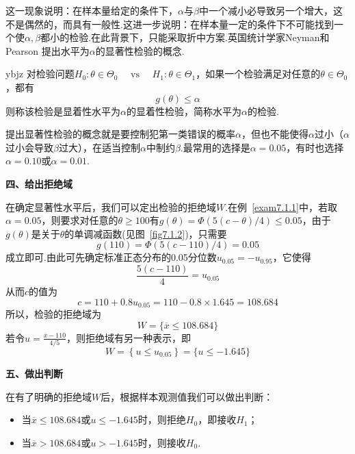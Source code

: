 这一现象说明：在样本量给定的条件下，$\alpha$与$\beta$中一个减小必导致另一个增大，这不是偶然的，而具有一般性.这进一步说明：在样本量一定的条件下不可能找到一个使$\alpha,\beta$都小的检验.在此背景下，只能采取折中方案.英国统计学家Neyman和Pearson 提出水平为$\alpha$的显著性检验的概念.
\begin{definition}{}{ybjz}
	对检验问题$H _ { 0 } : \theta \in \Theta _ { 0 } \quad \text { vs } \quad H _ { 1 } : \theta \in \Theta _ { 1 }$，如果一个检验满足对任意的$\theta \in \Theta _ { 0 }$，都有
	\[g ( \theta ) \leq \alpha\]
	则称该检验是显着性水平为$\alpha$的显着性检验，简称水平为$\alpha$的检验.
\end{definition}
提出显著性检验的概念就是要控制犯第一类错误的概率$\alpha$，但也不能使得$\alpha$过小（$\alpha$过小会导致$\beta$过大），在适当控制$\alpha$中制约$\beta$.最常用的选择是$\alpha=0.05$，有时也选择$\alpha=0.10$或$\alpha=0.01$.

\textbf{四、给出拒绝域}

在确定显著性水平后，我们可以定出检验的拒绝域$W$.在例~\ref{exam7.1.1}中，若取$\alpha=0.05$，则要求对任意的$\theta\geq 100$有$g ( \theta ) = \Phi ( 5 ( c - \theta ) / 4 ) \leq 0.05$，由于$g(\theta)$是关于$\theta$的单调减函数(见图~\ref{fig7.1.2})，只需要
\[g ( 110 ) = \Phi ( 5 ( c - 110 ) / 4 ) = 0.05\]
成立即可.由此可先确定标准正态分布的0.05分位数$u _ { 0.05 } = - u _ { 0.95 }$，它使得
\[\frac { 5 ( c - 110 ) } { 4 } = u _ { 0.05 }\]
从而$c$的值为
\[c = 110 + 0.8 u _ { 0.05 } = 110 - 0.8 \times 1.645 = 108.684\]
所以，检验的拒绝域为
\[W = \{\overline { x } \leq 108.684 \}\]
若令$u = \frac { \overline { x } - 110 } { 4 / 5 }$，则拒绝域有另一种表示，即
\[W = \left\{ u \leq u _ { 0.05 } \right\} = \{ u \leq - 1.645 \}\]

\textbf{五、做出判断}

在有了明确的拒绝域$W$后，根据样本观测值我们可以做出判断：
\begin{itemize}
	\item 当$\overline{x}\leq 108.684$或$u\leq -1.645$时，则拒绝$H_{0}$，即接收$H_{1}$；
	\item 当$\overline{ x }>108.684$或$u> -1.645$时，则接收$H_{0}$.
\end{itemize}

